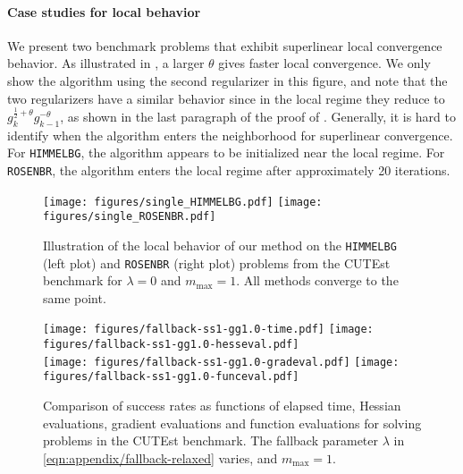 \paragraph{Case studies for local behavior}
We present two benchmark problems that exhibit superlinear local convergence behavior.  
As illustrated in , a larger $\theta$ gives faster local convergence.
We only show the algorithm using the second regularizer in this figure, and note that the two regularizers have a similar behavior since in the local regime they reduce to $g_k^{\frac{1}{2} + \theta} g_{k-1}^{-\theta}$, as shown in the last paragraph of the proof of .
Generally, it is hard to identify when the algorithm enters the neighborhood for superlinear convergence.
For \texttt{HIMMELBG}, the algorithm appears to be initialized near the local regime. 
For \texttt{ROSENBR}, the algorithm enters the local regime after approximately 20 iterations.

\begin{figure}[!tbp]
    \centering
    \texttt{[image: figures/single\_HIMMELBG.pdf]} \hfill
    \texttt{[image: figures/single\_ROSENBR.pdf]} \\
    \caption{
        Illustration of the local behavior of our method on the \texttt{HIMMELBG} (left plot) and \texttt{ROSENBR} (right plot) problems from the CUTEst benchmark for $\lambda=0$ and $m_{\mathrm{max}} = 1$.
        All methods converge to the same point. 
        }
    \label{fig:appendix-comparision-local}
\end{figure}

\begin{figure}[!tbp]
    \centering
    \texttt{[image: figures/fallback-ss1-gg1.0-time.pdf]} \hfill
    \texttt{[image: figures/fallback-ss1-gg1.0-hesseval.pdf]} \\
    \vspace{1em}
    \texttt{[image: figures/fallback-ss1-gg1.0-gradeval.pdf]} \hfill
    \texttt{[image: figures/fallback-ss1-gg1.0-funceval.pdf]} 
    \caption{
        Comparison of success rates as functions of elapsed time, Hessian evaluations, gradient evaluations and function evaluations for solving problems in the CUTEst benchmark.
        The fallback parameter $\lambda$ in \eqref{eqn:appendix/fallback-relaxed} varies, and $m_{\mathrm{max}} = 1$.
        }
    \label{fig:appendix-comparision-fallback}
\end{figure}

